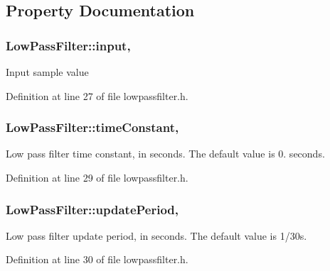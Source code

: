 \subsection{Property Documentation}
\hypertarget{class_low_pass_filter_a9a9e7b2ff54b0fc7268a5cc3e9e6fbf4}{
\subsubsection[{input}]{\setlength{\rightskip}{0pt plus 5cm}Low\-Pass\-Filter\-::input\hspace{0.3cm}{\ttfamily [read]}, {\ttfamily [write]}}}\label{class_low_pass_filter_a9a9e7b2ff54b0fc7268a5cc3e9e6fbf4}
Input sample value 

Definition at line 27 of file lowpassfilter.\-h.

\hypertarget{class_low_pass_filter_ab761ee5ebd0249c6724c17d1e0d42500}{
\subsubsection[{time\-Constant}]{\setlength{\rightskip}{0pt plus 5cm}Low\-Pass\-Filter\-::time\-Constant\hspace{0.3cm}{\ttfamily [read]}, {\ttfamily [write]}}}\label{class_low_pass_filter_ab761ee5ebd0249c6724c17d1e0d42500}
Low pass filter time constant, in seconds. The default value is 0. seconds. 

Definition at line 29 of file lowpassfilter.\-h.

\hypertarget{class_low_pass_filter_a2587a6787fa752084a473ec21a25222a}{
\subsubsection[{update\-Period}]{\setlength{\rightskip}{0pt plus 5cm}Low\-Pass\-Filter\-::update\-Period\hspace{0.3cm}{\ttfamily [read]}, {\ttfamily [write]}}}\label{class_low_pass_filter_a2587a6787fa752084a473ec21a25222a}
Low pass filter update period, in seconds. The default value is 1/30s. 

Definition at line 30 of file lowpassfilter.\-h.

